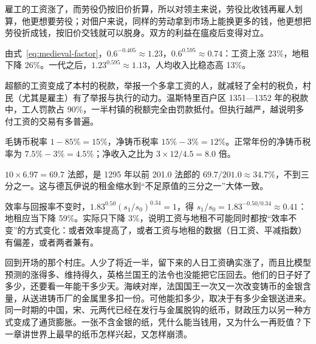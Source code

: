 \begin{answers}
\item 雇工的工资涨了，而劳役仍按旧价折算，所以对领主来说，劳役比收钱再雇人划算，他更想要劳役；对佃户来说，同样的劳动拿到市场上能换更多的钱，他更想把劳役折成钱，按旧价交钱就可以脱身。双方的利益在瘟疫后变得对立。
\item 由式~\eqref{eq:medieval-factor}，$0.6^{-0.405}\approx1.23$，$0.6^{0.595}\approx0.74$：工资上涨 23\%，地租下降 26\%。一代之后，$1.23^{0.595}\approx1.13$，人均收入比稳态高 13\%。
\item 超额的工资变成了本村的税款，举报一个多拿工资的人，就减轻了全村的税负，村民（尤其是雇主）有了举报与执行的动力。温斯特里百户区 1351—1352 年的税款中，工人罚款占 90\%，一半村镇的税额完全由罚款抵付。但执行越严，越说明多付工资的交易有多普遍。
\item 毛铸币税率 $1-85\%=15\%$，净铸币税率 $15\%-3\%=12\%$。正常年份的净铸币税率为 $7.5\%-3\%=4.5\%$；净收入之比为 $3\times12/4.5=8.0$ 倍。
\item $10\times6.97=69.7$ 法郎，是 1295 年以前 201.0 法郎的 $69.7/201.0\approx34.7\%$，不到三分之一。这与德瓦伊说的租金缩水到“不足原值的三分之一”大体一致。
\item 效率与回报率不变时，$1.83^{0.50}(s_1/s_0)^{0.34}=1$，得 $s_1/s_0=1.83^{-0.50/0.34}\approx0.41$：地租应当下降 59\%。实际只下降 3\%，说明工资与地租不可能同时都按“效率不变”的方式变化：或者效率提高了，或者工资与地租的数据（日工资、平减指数）有偏差，或者两者兼有。
\end{answers}

回到开场的那个村庄。人少了将近一半，留下来的人日工资确实涨了，而且比模型预测的涨得多、维持得久，英格兰国王的法令也没能把它压回去。他们的日子好了多少，还要看一年能干多少天。海峡对岸，法国国王一次又一次改变铸币的金银含量，从送进铸币厂的金属里多扣一份。可他能扣多少，取决于有多少金银送进来。同一时期的中国，宋、元两代已经在发行与金属脱钩的纸币，财政压力以另一种方式变成了通货膨胀。一张不含金银的纸，凭什么能当钱用，又为什么一再贬值？下一章讲世界上最早的纸币怎样兴起，又怎样崩溃。
